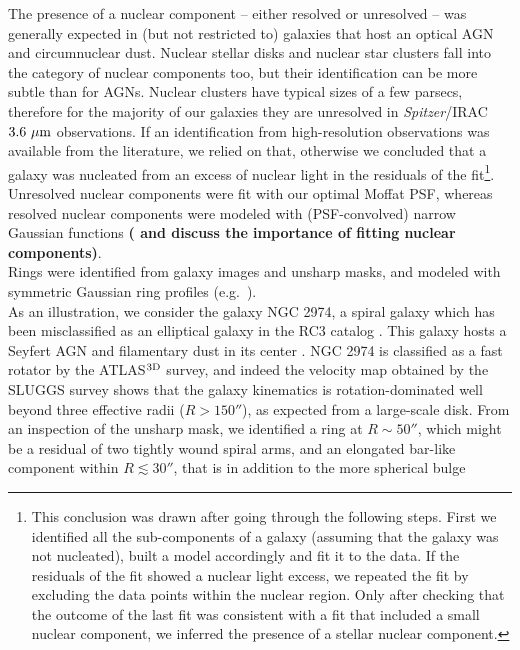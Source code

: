 \documentclass[preprint2]{emulateapj}
\begin{document}
The presence of a nuclear component -- either resolved or unresolved -- was generally expected in 
(but not restricted to) galaxies that host an optical AGN and circumnuclear dust.
Nuclear stellar disks and nuclear star clusters fall into the category of nuclear components too,
but their identification can be more subtle than for AGNs.
Nuclear clusters have typical sizes of a few parsecs, 
therefore for the majority of our galaxies they are unresolved in \emph{Spitzer}/IRAC $3.6~\rm \mu m$ observations.
If an identification from high-resolution observations was available from the literature, we relied on that, 
otherwise we concluded that a galaxy was nucleated from an excess of nuclear light in the residuals of the 
fit\footnote{This conclusion was drawn after going through the following steps. 
First we identified all the sub-components of a galaxy 
(assuming that the galaxy was not nucleated), built a model accordingly and fit it to the data.
If the residuals of the fit showed a nuclear light excess, 
we repeated the fit by excluding the data points within the nuclear region.
Only after checking that the outcome of the last fit was consistent with a fit that included a small nuclear component, 
we inferred the presence of a stellar nuclear component.}.
Unresolved nuclear components were fit with our optimal Moffat PSF,
whereas resolved nuclear components were modeled with (PSF-convolved) narrow Gaussian functions 
{\bf (\citealt{wadadekar1999,ravindranath2001,peng2002} and \citealt{gadotti2008} discuss the importance of fitting nuclear components)}. \\
Rings were identified from galaxy images and unsharp masks, and modeled with symmetric Gaussian ring profiles 
(e.g.~\citealt{sheth2010,kim2014}). \\
As an illustration, we consider the galaxy NGC 2974, 
a spiral galaxy which has been misclassified as an elliptical galaxy in the RC3 catalog \citep{RC3}. 
This galaxy hosts a Seyfert AGN \citep{veroncettyveron2006} and filamentary dust in its center \citep{tran2001}.
NGC 2974 is classified as a fast rotator by the ATLAS$^{\rm 3D}$ survey, 
and indeed the velocity map obtained by the SLUGGS survey shows that the galaxy kinematics is rotation-dominated 
well beyond three effective radii ($R>150''$), 
as expected from a large-scale disk. 
From an inspection of the unsharp mask, we identified a ring at $R \sim 50''$, 
which might be a residual of two tightly wound spiral arms,
and an elongated bar-like component within $R \lesssim 30''$,
that is in addition to the more spherical bulge 
\end{document}
